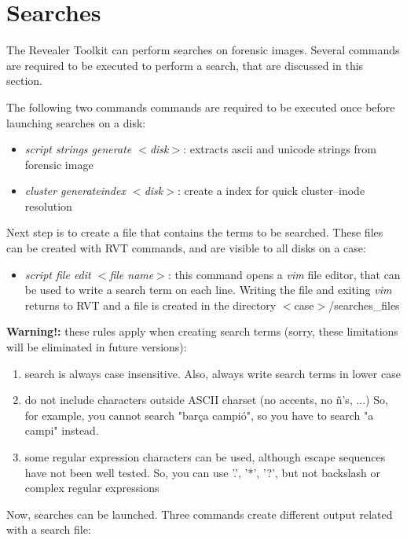 \documentclass[a4paper,11pt,oneside]{report}
\begin{document}
\section{Searches} \label{anx:searches}

The Revealer Toolkit can perform searches on forensic images. Several commands are required to be executed to perform a search, that are discussed in this section.

The following two commands commands are required to be executed once before launching searches on a disk:

\begin{itemize}
\item \emph{script strings generate $<$disk$>$}:  extracts ascii and unicode strings from forensic image 
\item \emph{cluster generateindex $<$disk$>$}:  create a index for quick cluster--inode resolution
\end{itemize}

Next step is to create a file that contains the terms to be searched. These files can be created with RVT commands, and are visible to all disks on a case:

\begin{itemize}
\item \emph{script file edit $<$file name$>$}: this command opens a \emph{vim} file editor, that can be used to write a search term on each line. Writing the file and exiting \emph{vim} returns to RVT and a file is created in the directory $<$case$>$/searches\_files 
\end{itemize}

\textbf{Warning!:}  these rules apply when creating search terms (sorry, these limitations will be eliminated in future versions):

\begin{enumerate}
\item search is always case insensitive. Also, always write search terms in lower case
\item do not include characters outside ASCII charset (no accents, no ñ's, ...) So, for example, you cannot search "barça campió", so you have to search "a campi" instead. 
\item some regular expression characters can be used, although escape sequences have not been well tested. So, you can use '.', '*', '?', but not backslash or complex regular expressions 
\end{enumerate}

Now, searches can be launched. Three commands create different output related with a search file:
\end{document}

